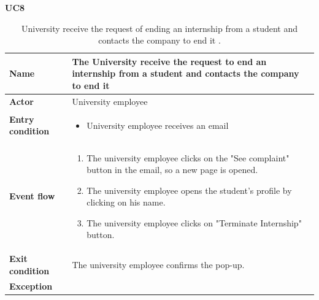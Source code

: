     \textbf{UC8}
    \nopagebreak
    \begin{table}[H]
        \centering
        \begin{tabular}{|l|p{11.9cm}|}
        \hline
        \textbf{Name}            & The University receive the request to end an internship from a student and contacts the company to end it \\\hline
        \textbf{Actor}           & University employee     \\\hline
        \textbf{Entry condition} &
        \begin{itemize}
              \item University employee receives an email 
        \end{itemize}                                        \\\hline
        \textbf{Event flow}      &
        \begin{enumerate}[label=\arabic*.]
              \item The university employee clicks on the "See complaint" button in the email, so a new page is opened.
              \item The university employee opens the student's profile by clicking on his name.
              \item The university employee clicks on "Terminate Internship" button.
              
        \end{enumerate}            \\\hline
        \textbf{Exit condition}  & The university employee confirms the pop-up.  \\\hline
        \textbf{Exception}       &    \\\hline
        \end{tabular}
        \caption{University receive the request of ending an internship from a student and contacts the company to end it .}
        \label{table:University receive the request of ending an internship from a student and contact the company to end it }
    \end{table}

